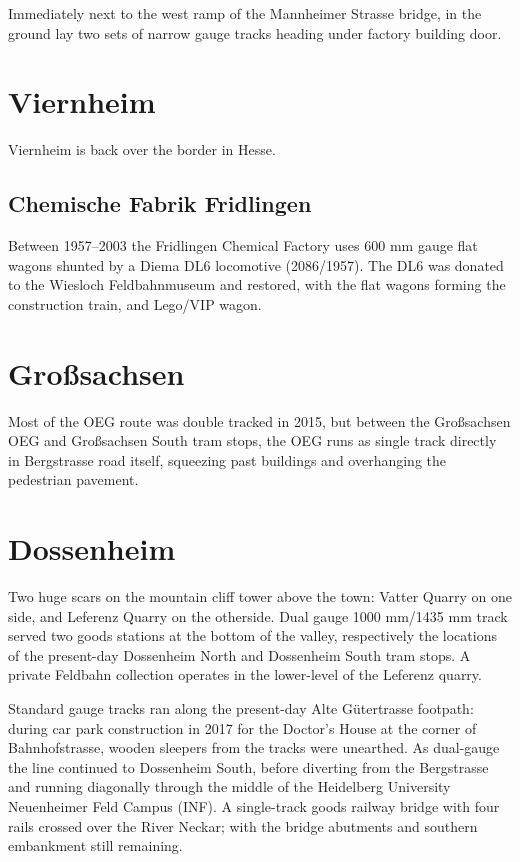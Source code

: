 \documentclass[a4paper]{report}
\begin{document}
Immediately next to the west ramp of the Mannheimer Strasse bridge, in
the ground lay two sets of narrow gauge tracks heading under
factory building door.

\section{Viernheim}

Viernheim is back over the border in Hesse.

\subsection{Chemische Fabrik Fridlingen}

Between 1957--2003 the Fridlingen Chemical Factory uses 600 mm gauge
flat wagons shunted by a Diema DL6 locomotive (2086/1957).  The DL6
was donated to the Wiesloch Feldbahnmuseum and restored, with the flat
wagons forming the construction train, and Lego/VIP wagon.

\section{Großsachsen}

Most of the OEG route was double tracked in 2015, but between the
Großsachsen OEG and Großsachsen South tram stops, the OEG runs as
single track directly in Bergstrasse road itself, squeezing past
buildings and overhanging the pedestrian pavement.

\section{Dossenheim}

Two huge scars on the mountain cliff tower above the town: Vatter
Quarry on one side, and Leferenz Quarry on the otherside.  Dual gauge
1000 mm/1435 mm track served two goods stations at the bottom of the
valley, respectively the locations of the present-day Dossenheim North
and Dossenheim South tram stops.  A private Feldbahn collection
operates in the lower-level of the Leferenz quarry.

Standard gauge tracks ran along the present-day Alte Gütertrasse
footpath: during car park construction in 2017 for the Doctor's House
at the corner of Bahnhofstrasse, wooden sleepers from the tracks were
unearthed.  As dual-gauge the line continued to Dossenheim South,
before diverting from the Bergstrasse and running diagonally through
the middle of the Heidelberg University Neuenheimer Feld Campus (INF).
A single-track goods railway bridge with four rails crossed over the
River Neckar; with the bridge abutments and southern embankment still remaining.
\end{document}
